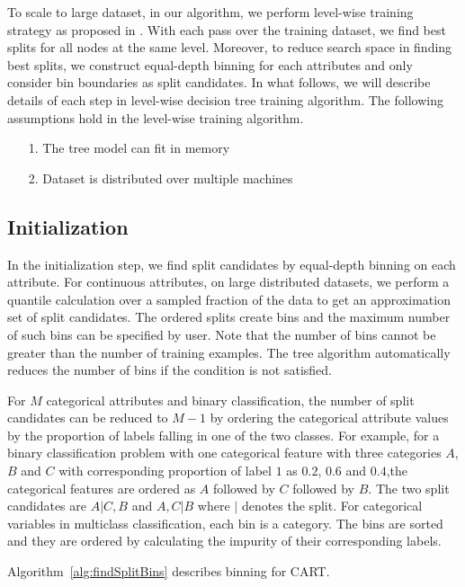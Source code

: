 To scale to large dataset, in our algorithm, we perform level-wise training
strategy as proposed in \cite{panda2009planet}. With each
pass over the training dataset, we find best splits for all nodes at the same
level. Moreover, to reduce search space in finding best splits, we construct
equal-depth binning for each attributes and only consider bin boundaries as split
candidates. In what follows, we will describe details of each step in level-wise
decision tree training algorithm. The following assumptions hold in the level-wise
training algorithm.

\begin{itemize}
\item[1.] The tree model can fit in memory
\item[2.] Dataset is distributed over multiple machines
\end{itemize}

\subsection{Initialization}
In the initialization step, we find split candidates by equal-depth binning on
each attribute. For continuous attributes, on large distributed datasets, we
perform a quantile calculation over a sampled fraction of the data to get an
approximation set of split candidates. The ordered splits create bins and the
maximum number of such bins can be specified by user. Note that the number of
bins cannot be greater than the number of training examples. The tree algorithm
automatically reduces the number of bins if the condition is not satisfied.

For $M$ categorical attributes and binary classification, the number of split
candidates can be reduced to $M-1$ by ordering the categorical attribute values
by the proportion of labels falling in one of the two classes. For example, for
a binary classification problem with one categorical feature with three
categories $A$, $B$ and $C$ with corresponding proportion of label $1$ as $0.2$,
$0.6$ and $0.4$,the categorical features are ordered as $A$ followed by $C$
followed by $B$. The two split candidates are $A|C,B$ and $A,C|B$
where $|$ denotes the split. For categorical variables in multiclass classification,
each bin is a category. The bins are sorted and they are ordered by calculating
the impurity of their corresponding labels.

Algorithm~\ref{alg:findSplitBins} describes binning for CART.

